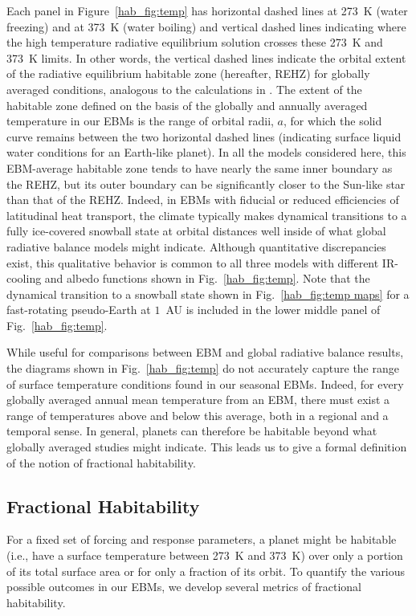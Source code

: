 Each panel in Figure~\ref{hab_fig:temp} has horizontal dashed lines at
273~K (water freezing) and at 373~K (water boiling) and vertical
dashed lines indicating where the high temperature radiative
equilibrium solution crosses these 273~K and 373~K limits.  In other
words, the vertical dashed lines indicate the orbital extent of the
radiative equilibrium habitable zone (hereafter, REHZ) for globally
averaged conditions, analogous to the calculations in
\citet{kasting_et_al1993}.  The extent of the habitable zone defined
on the basis of the globally and annually averaged temperature in our
EBMs is the range of orbital radii, $a$, for which the solid curve
remains between the two horizontal dashed lines (indicating surface
liquid water conditions for an Earth-like planet). In all the models
considered here, this EBM-average habitable zone tends to have nearly
the same inner boundary as the REHZ, but its outer boundary can be
significantly closer to the Sun-like star than that of the
REHZ. Indeed, in EBMs with fiducial or reduced efficiencies of
latitudinal heat transport, the climate typically makes dynamical
transitions to a fully ice-covered snowball state at orbital distances
well inside of what global radiative balance models might
indicate. Although quantitative discrepancies exist, this qualitative
behavior is common to all three models with different IR-cooling and
albedo functions shown in Fig.~\ref{hab_fig:temp}. Note that the
dynamical transition to a snowball state shown in
Fig.~\ref{hab_fig:temp maps} for a fast-rotating pseudo-Earth at
$1$~AU is included in the lower middle panel of
Fig.~\ref{hab_fig:temp}.

While useful for comparisons between EBM and global radiative balance
results, the diagrams shown in Fig.~\ref{hab_fig:temp} do not
accurately capture the range of surface temperature conditions found
in our seasonal EBMs. Indeed, for every globally averaged annual mean
temperature from an EBM, there must exist a range of temperatures
above and below this average, both in a regional and a temporal
sense. In general, planets can therefore be habitable beyond what
globally averaged studies might indicate. This leads us to give a
formal definition of the notion of fractional habitability.


\subsection{Fractional Habitability}
\label{hab_ssec:FracHab}

For a fixed set of forcing and response parameters, a planet might be
habitable (i.e., have a surface temperature between 273~K and 373~K)
over only a portion of its total surface area or for only a fraction
of its orbit.  To quantify the various possible outcomes in our EBMs,
we develop several metrics of fractional habitability.

